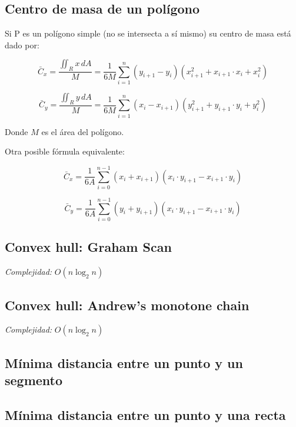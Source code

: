 \documentclass[10pt,letterpaper,twocolumn]{article}
\newcommand{\codigofuente}[1]{

\dotfill
}
\begin{document}
\bigskip
\codigofuente{./src/geometria/polygon_area.cpp}

\subsection{Centro de masa de un polígono}
Si P es un polígono simple (no se intersecta a sí mismo) su centro de masa está dado por:


$$ \displaystyle\bar{C}_{x} = \frac{ \displaystyle\iint_{R} x \, dA }{M} = \frac{1}{6M}\sum_{i=1}^{n} (y_{i+1} - y_{i}) (x_{i+1}^2 + x_{i+1} \cdot x_{i} + x_{i}^2) $$

\medskip

$$ \displaystyle\bar{C}_{y} = \frac{ \displaystyle\iint_{R} y \, dA }{M} = \frac{1}{6M} \sum_{i=1}^{n} (x_{i} - x_{i+1}) (y_{i+1}^2 + y_{i+1} \cdot y_{i} + y_{i}^2) $$

\medskip

Donde $ M $ es el área del polígono.

Otra posible fórmula equivalente:

$$ \displaystyle\bar{C}_{x} = \frac{1}{6A} \sum_{i=0}^{n-1} (x_{i} + x_{i+1}) (x_{i} \cdot y_{i+1} - x_{i+1} \cdot y_{i}) $$

\medskip

$$ \displaystyle\bar{C}_{y} = \frac{1}{6A} \sum_{i=0}^{n-1} (y_{i} + y_{i+1}) (x_{i} \cdot y_{i+1} - x_{i+1} \cdot y_{i}) $$


\subsection{Convex hull: Graham Scan}
\emph{Complejidad:} $ O(n \log_{2}{n}) $
\codigofuente{./src/geometria/grahamscan.cpp}

\subsection{Convex hull: Andrew's monotone chain}
\emph{Complejidad:} $ O(n \log_{2}{n}) $
\codigofuente{./src/geometria/monotonechain.cpp}

\subsection{Mínima distancia entre un punto y un segmento}
\codigofuente{./src/geometria/distance_point_to_segment.cpp}

\subsection{Mínima distancia entre un punto y una recta}
\codigofuente{./src/geometria/distance_point_to_line.cpp}
\end{document}
